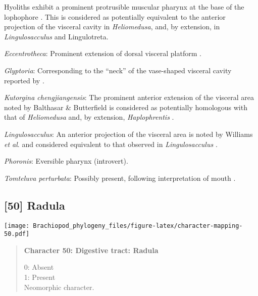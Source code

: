 \documentclass[openany]{book}
\theoremstyle{definition}
\theoremstyle{definition}
\theoremstyle{definition}
\theoremstyle{remark}
\begin{document}
Hyoliths exhibit a prominent protrusible muscular pharynx at the base of
the lophophore \citep{Moysiuk2017Hyolithsare}. This is considered as
potentially equivalent to the anterior projection of the visceral cavity
in \emph{Heliomedusa}, and, by extension, in \emph{Lingulosacculus} and
Lingulotreta.

\hypertarget{Eccentrotheca-coding-49}{}
\emph{Eccentrotheca}: Prominent extension of dorsal visceral platform
\citep{Balthasar2009Thebrachiopod}.

\hypertarget{Glyptoria-coding-49}{}
\emph{Glyptoria}: Corresponding to the ``neck'' of the vase-shaped
visceral cavity reported by \citet{Zhang2009Architectureand}.

\hypertarget{Kutorgina_chengjiangensis-coding-49}{}
\emph{Kutorgina chengjiangensis}: The prominent anterior extension of
the visceral area noted by Balthasar \& Butterfield
\citeyearpar{Balthasar2009EarlyCambrian} is considered as potentially
homologous with that of \emph{Heliomedusa}
\citep{Zhang2009Architectureand} and, by extension, \emph{Haplophrentis}
\citep{Moysiuk2017Hyolithsare}.

\hypertarget{Lingulosacculus-coding-49}{}
\emph{Lingulosacculus}: An anterior projection of the visceral area is
noted by Williams \emph{et al}.
\citeyearpar{Williams2000LinguliformeaCraniiformea} and considered
equivalent to that observed in \emph{Lingulosacculus}
\citep{Balthasar2009EarlyCambrian}.

\hypertarget{Phoronis-coding-49}{}
\emph{Phoronis}: Eversible pharynx (introvert).

\hypertarget{Tomteluva_perturbata-coding-49}{}
\emph{Tomteluva perturbata}: Possibly present, following interpretation
of mouth \citep[see fig. 2c, d in][]{Zhang2014Anearly}.

\subsection*{{[}50{]} Radula}\label{radula}

\texttt{[image: Brachiopod\_phylogeny\_files/figure-latex/character-mapping-50.pdf]}

\begin{quote}
\textbf{Character 50: Digestive tract: Radula}

0: Absent\\
1: Present\\
Neomorphic character.
\end{quote}
\end{document}
